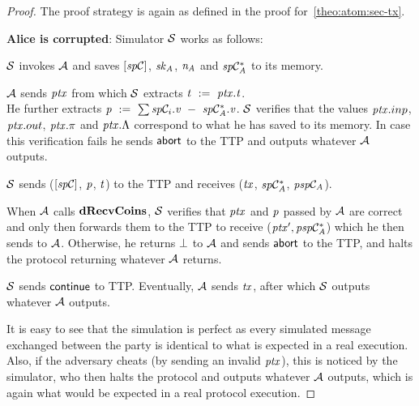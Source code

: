 \begin{proof}
    The proof strategy is again as defined in the proof for~\cref{theo:atom:sec-tx}.

    \textbf{Alice is corrupted}: Simulator $\mathcal{S}$ works as follows:
    \begin{asparaenum}
        \item $\mathcal{S}$ invokes $\mathcal{A}$ and saves $[\mathit{sp}\mathcal{C}]$, $\mathit{sk}_{\mathit{A}}$, $\mathit{\mathit{n}_{\mathit{A}}}$ and $\mathit{sp}\mathcal{C}_{\mathit{A}}^*$ to its memory.
        \item $\mathcal{A}$ sends $\mathit{ptx}$ from which $\mathcal{S}$ extracts $\mathit{t} ~:=~ \mathit{ptx}.\mathit{t}$. \\
        He further extracts $\mathit{p} ~:=~ \sum\mathit{sp}\mathcal{C}_i.\mathit{v} ~-~ \mathit{sp}\mathcal{C}_{\mathit{A}}^*.\mathit{v}$.
        $\mathcal{S}$ verifies that the values $\mathit{ptx}.inp$, $\mathit{ptx}.out$, $\mathit{ptx}.\pi$ and $\mathit{ptx}.\Lambda$ correspond to what he has saved to its memory.
        In case this verification fails he sends $\mathsf{abort}$ to the TTP and outputs whatever $\mathcal{A}$ outputs.
        \item $\mathcal{S}$ sends ($[\mathit{sp}\mathcal{C}]$, $\mathit{p}$, $\mathit{t}$) to the TTP and receives ($\mathit{tx}$, $\mathit{sp}\mathcal{C}_{\mathit{A}}^*$, $\mathit{psp}\mathcal{C}_{\mathit{A}}$).
        \item When $\mathcal{A}$ calls $\mathbf{dRecvCoins}$, $\mathcal{S}$ verifies that $\mathit{ptx}$ and $\mathit{p}$ passed by $\mathcal{A}$ are correct and only then forwards them to the TTP to receive (${\mathit{ptx}}', \mathit{psp}\mathcal{C}_{\mathit{A}}^*$) which he then sends to $\mathcal{A}$.
        Otherwise, he returns $\bot$ to $\mathcal{A}$ and sends $\mathsf{abort}$ to the TTP, and halts the protocol returning whatever $\mathcal{A}$ returns.
        \item $\mathcal{S}$ sends $\mathsf{continue}$ to TTP.
        Eventually, $\mathcal{A}$ sends $\mathit{tx}$, after which $\mathcal{S}$ outputs whatever $\mathcal{A}$ outputs.
    \end{asparaenum}

    It is easy to see that the simulation is perfect as every simulated message exchanged between the party is identical to what is expected in a real execution.
    Also, if the adversary cheats (by sending an invalid $\mathit{ptx}$), this is noticed by the simulator, who then halts the protocol and outputs whatever $\mathcal{A}$ outputs, which is again what would be expected in a real protocol execution.


\end{proof}
